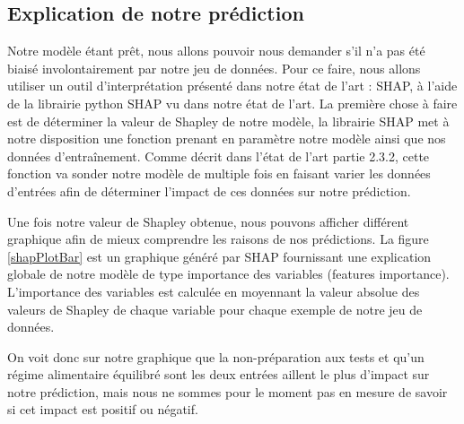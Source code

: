 \subsection{Explication de notre prédiction}
Notre modèle étant prêt, nous allons pouvoir nous demander s'il n'a pas été biaisé involontairement par notre jeu de données. Pour ce faire, nous allons utiliser un outil d'interprétation présenté dans notre état de l'art : SHAP, à l'aide de la librairie python SHAP vu dans notre état de l'art. La première chose à faire est de déterminer la valeur de Shapley de notre modèle, la librairie SHAP met à notre disposition une fonction prenant en paramètre notre modèle ainsi que nos données d'entraînement. Comme décrit dans l'état de l'art partie 2.3.2, cette fonction va sonder notre modèle de multiple fois en faisant varier les données d'entrées afin de déterminer l'impact de ces données sur notre prédiction.\par
Une fois notre valeur de Shapley obtenue, nous pouvons afficher différent graphique afin de mieux comprendre les raisons de nos prédictions. La figure \ref{shapPlotBar} est un graphique généré par SHAP fournissant une explication globale de notre modèle de type importance des variables (features importance). L’importance des variables est calculée en moyennant la valeur absolue des valeurs de Shapley de chaque variable pour chaque exemple de notre jeu de données.

On voit donc sur notre graphique que la non-préparation aux tests et qu'un régime alimentaire équilibré sont les deux entrées aillent le plus d'impact sur notre prédiction, mais nous ne sommes pour le moment pas en mesure de savoir si cet impact est positif ou négatif.

